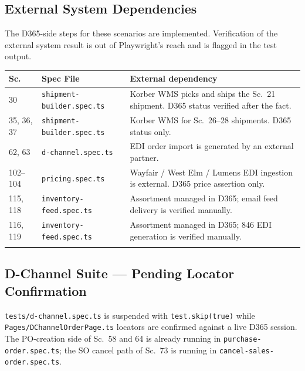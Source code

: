 \documentclass[a4paper,11pt]{article}
\begin{document}
\subsection{External System Dependencies}

\noindent The D365-side steps for these scenarios are implemented. Verification of the external system result is out of Playwright's reach and is flagged in the test output.

\vspace{0.2cm}
\begin{longtable}{p{} p{} p{}}
\toprule
\textbf{Sc.} & \textbf{Spec File} & \textbf{External dependency} \\
\midrule
\endhead
30 & \texttt{shipment-builder.spec.ts} & Korber WMS picks and ships the Sc.\ 21 shipment. D365 status verified after the fact. \\\relax
\cmidrule{1-3}
35, 36, 37 & \texttt{shipment-builder.spec.ts} & Korber WMS for Sc.\ 26--28 shipments. D365 status only. \\\relax
\cmidrule{1-3}
62, 63 & \texttt{d-channel.spec.ts} & EDI order import is generated by an external partner. \\\relax
\cmidrule{1-3}
102--104 & \texttt{pricing.spec.ts} & Wayfair / West Elm / Lumens EDI ingestion is external. D365 price assertion only. \\\relax
\cmidrule{1-3}
115, 118 & \texttt{inventory-feed.spec.ts} & Assortment managed in D365; email feed delivery is verified manually. \\\relax
\cmidrule{1-3}
116, 119 & \texttt{inventory-feed.spec.ts} & Assortment managed in D365; 846 EDI generation is verified manually. \\\relax
\cmidrule{1-3}
\bottomrule
\end{longtable}

\subsection{D-Channel Suite --- Pending Locator Confirmation}

\noindent \texttt{tests/d-channel.spec.ts} is suspended with \texttt{test.skip(true)} while \texttt{Pages/DChannelOrderPage.ts} locators are confirmed against a live D365 session. The PO-creation side of Sc.\ 58 and 64 is already running in \texttt{purchase-order.spec.ts}; the SO cancel path of Sc.\ 73 is running in \texttt{cancel-sales-order.spec.ts}.
\end{document}
